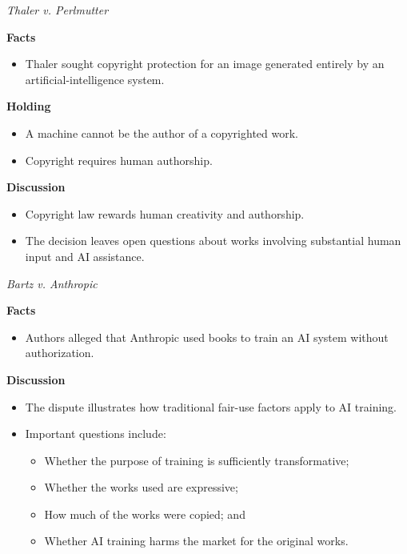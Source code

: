 \documentclass[11pt]{tex/lawoutline}
\begin{document}
\casebox
{\textit{Thaler v. Perlmutter}}
{}
{
\textbf{Facts}
\begin{itemize}
    \item Thaler sought copyright protection for an image generated entirely by an artificial-intelligence system.
\end{itemize}

\textbf{Holding}
\begin{itemize}
    \item A machine cannot be the author of a copyrighted work.
    \item Copyright requires human authorship.
\end{itemize}

\textbf{Discussion}
\begin{itemize}
    \item Copyright law rewards human creativity and authorship.
    \item The decision leaves open questions about works involving substantial human input and AI assistance.
\end{itemize}
}

\casebox
{\textit{Bartz v. Anthropic}}
{}
{
\textbf{Facts}
\begin{itemize}
    \item Authors alleged that Anthropic used books to train an AI system without authorization.
\end{itemize}

\textbf{Discussion}
\begin{itemize}
    \item The dispute illustrates how traditional fair-use factors apply to AI training.
    \item Important questions include:
    \begin{itemize}
        \item Whether the purpose of training is sufficiently transformative;
        \item Whether the works used are expressive;
        \item How much of the works were copied; and
        \item Whether AI training harms the market for the original works.
    \end{itemize}
\end{itemize}
}
\end{document}
